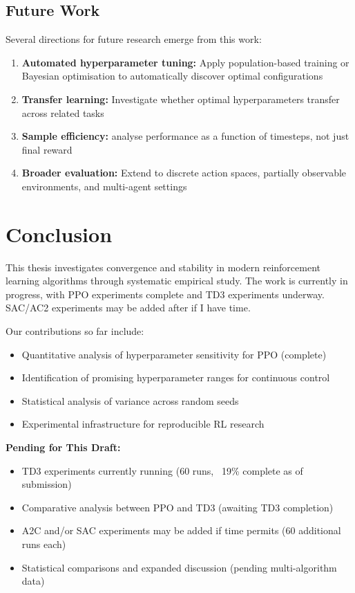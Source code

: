 \documentclass[12pt,a4paper]{report}
\begin{document}
\section{Future Work}

Several directions for future research emerge from this work:

\begin{enumerate}
    \item \textbf{Automated hyperparameter tuning:} Apply population-based training or Bayesian optimisation to automatically discover optimal configurations
    \item \textbf{Transfer learning:} Investigate whether optimal hyperparameters transfer across related tasks
    \item \textbf{Sample efficiency:} analyse performance as a function of timesteps, not just final reward
    \item \textbf{Broader evaluation:} Extend to discrete action spaces, partially observable environments, and multi-agent settings
\end{enumerate}

\chapter{Conclusion}

This thesis investigates convergence and stability in modern reinforcement learning algorithms through systematic empirical study. The work is currently in progress, with PPO experiments complete and TD3 experiments underway. SAC/AC2 experiments may be added after if I have time.

Our contributions so far include:
\begin{itemize}
    \item Quantitative analysis of hyperparameter sensitivity for PPO (complete)
    \item Identification of promising hyperparameter ranges for continuous control
    \item Statistical analysis of variance across random seeds
    \item Experimental infrastructure for reproducible RL research
\end{itemize}

\textbf{Pending for This Draft:}
\begin{itemize}
    \item TD3 experiments currently running (60 runs, ~19\% complete as of submission)
    \item Comparative analysis between PPO and TD3 (awaiting TD3 completion)
    \item A2C and/or SAC experiments may be added if time permits (60 additional runs each)
    \item Statistical comparisons and expanded discussion (pending multi-algorithm data)
\end{itemize}
\end{document}
